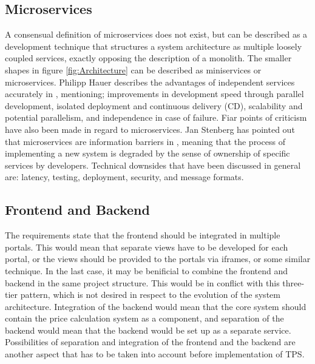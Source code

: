 \subsection{Microservices}
A consensual definition of microservices does not exist, but can be described as a development technique that structures a system architecture as multiple loosely coupled services, exactly opposing the description of a monolith. The smaller shapes in figure \ref{fig:Architecture} can be described as miniservices or microservices. Philipp Hauer describes the advantages of independent services accurately in \cite{microservices}, mentioning; improvements in development speed through parallel development, isolated deployment and continuous delivery (CD), scalability and potential parallelism, and independence in case of failure. Fiar points of criticism have also been made in regard to microservices. Jan Stenberg has pointed out that microservices are information barriers in \cite{JS-microservices}, meaning that the process of implementing a new system is degraded by the sense of ownership of specific services by developers. Technical downsides that have been discussed in general are: latency, testing, deployment, security, and message formats.

\subsection{Frontend and Backend}
The requirements state that the frontend should be integrated in multiple portals. This would mean that separate views have to be developed for each portal, or the views should be provided to the portals via iframes, or some similar technique. In the last case, it may be benificial to combine the frontend and backend in the same project structure. This would be in conflict with this three-tier pattern, which is not desired in respect to the evolution of the system architecture. Integration of the backend would mean that the core system should contain the price calculation system as a component, and separation of the backend would mean that the backend would be set up as a separate service. Possibilities of separation and integration of the frontend and the backend are another aspect that has to be taken into account before implementation of TPS.

%

